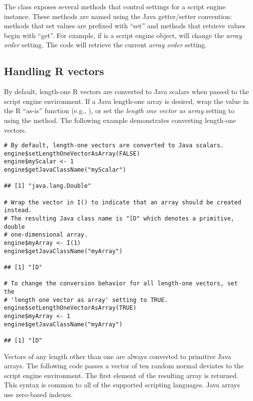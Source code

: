 The   class exposes several methods that control settings for a script engine instance. These methods are named using the Java getter/setter convention: methods that set values are prefixed with ``set'' and methods that retrieve values begin with ``get''. For example, if  is a script engine object,  will change the \textit{array order} setting. The code  will retrieve the current \textit{array order} setting.

\hypertarget{handlingrvectors}{\subsection{Handling R vectors}}

By default, length-one R vectors are converted to Java scalars when passed to the script engine environment. If a Java length-one array is desired, wrap the value in the R ``as-is'' function (e.g., ), or set the \textit{length one vector as array} setting to  using the  method. The following example demonstrates converting length-one vectors.

\begin{verbatim}
# By default, length-one vectors are converted to Java scalars.
engine$setLengthOneVectorAsArray(FALSE)
engine$myScalar <- 1
engine$getJavaClassName("myScalar")

## [1] "java.lang.Double"

# Wrap the vector in I() to indicate that an array should be created instead.
# The resulting Java class name is "[D" which denotes a primitive, double 
# one-dimensional array.
engine$myArray <- I(1)
engine$getJavaClassName("myArray")

## [1] "[D"

# To change the conversion behavior for all length-one vectors, set the 
# 'length one vector as array' setting to TRUE.
engine$setLengthOneVectorAsArray(TRUE)
engine$myArray <- 1
engine$getJavaClassName("myArray")

## [1] "[D"
\end{verbatim}

Vectors of any length other than one are always converted to primitive Java arrays. The following code passes a vector of ten random normal deviates to the script engine environment. The first element of the resulting array is returned. This syntax is common to all of the supported scripting languages.  Java arrays use zero-based indexes.

